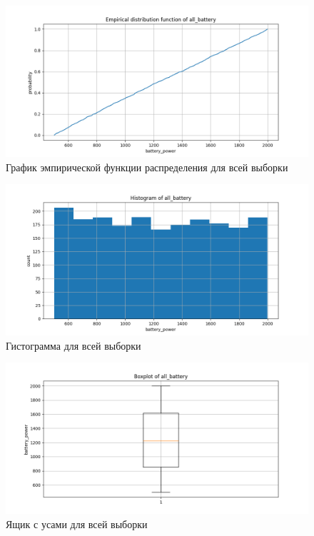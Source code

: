 \documentclass[a4paper, 12pt]{article}
\begin{document}
    \begin{figure}[H]
        \centering
        \includegraphics[scale=0.55]{all_battery_edf.png}
        \captionsetup{skip=0pt}
        \caption{График эмпирической функции распределения для всей выборки}
        \label{fig:allbedf}
    \end{figure}
    \begin{figure}[H]
        \centering
        \includegraphics[scale=0.55]{all_battery_hist.png}
        \captionsetup{skip=0pt}
        \caption{Гистограмма для всей выборки}
        \label{fig:allbhist}
    \end{figure}
    \begin{figure}[H]
        \centering
        \includegraphics[scale=0.55]{all_battery_box.png}
        \captionsetup{skip=0pt}
        \caption{Ящик с усами для всей выборки}
        \label{fig:allbbox}
    \end{figure}
\end{document}
